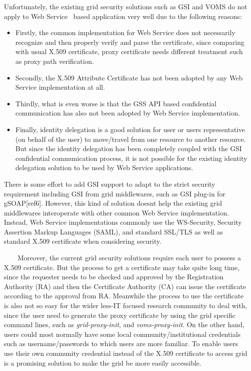 \documentclass{article}
\newcommand\liststyleLii{%
\renewcommand\labelitemi{${\bullet}$}
\renewcommand\labelitemii{${\circ}$}
\renewcommand\labelitemiii{${\blacksquare}$}
\renewcommand\labelitemiv{${\bullet}$}
}
\begin{document}
Unfortunately, the existing grid security solutions such as GSI and VOMS
do not apply to Web Service \ based application very well due to the
following reasons:

\liststyleLii
\begin{itemize}
\item Firstly, the common implementation for Web Service does not
necessarily recognize and then properly verify and parse the
certificate, since comparing with usual X.509 certificate, proxy
certificate needs different treatment such as proxy path verification. 
\item Secondly, the X.509 Attribute Certificate has not been adopted by
any Web Service implementation at all. 
\item Thirdly, what is even worse is that the GSS API based confidential
communication has also not been adopted by Web Service implementation.
\item Finally, identity delegation is a good solution for user or
user{\textquotesingle}s representative (on behalf of the user) to
move/travel from one resource to another resource. But since the
identity delegation has been completely coupled with the GSI
confidential communication process, it is not possible for the existing
identity delegation solution to be used by Web Service applications.
\end{itemize}
There is some effort to add GSI support to adapt to the strict security
requirement including GSI from grid middlewares, such as GSI plug-in
for gSOAP[ref6]. However, this kind of solution
doesn{\textquotesingle}t help the existing grid middlewares
interoperate with other common Web Service implementation. Instead, Web
Service implementations commonly use the WS-Security, Security
Assertion Markup Languages (SAML), and standard SSL/TLS as well as
standard X.509 certificate when considering security. \ 

\ \ \ \ Moreover, the current grid security solutions require each user
to possess a X.509 certificate. But the process to get a certificate
may take quite long time, since the requester needs to be checked and
approved by the Registration Authority (RA) and then the Certificate
Authority (CA) can issue the certificate according to the approval from
RA. Meanwhile the process to use the certificate is also not so easy
for the wider less-IT focused research community to deal with, since
the user need to generate the proxy certificate by using the grid
specific command lines, such as \textit{grid-proxy-init}, and
\textit{voms-proxy-init}. On the other hand, users could most normally
have some local community/institutional credentials such as
username/passwords to which users are more familiar. To enable users
use their own community credential instead of the X.509 certificate to
access grid is a promising solution to make the grid be more easily
accessible. 
\end{document}
